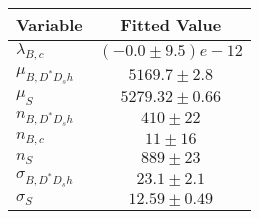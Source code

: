 \begin{tabular}[t]{lc}
\hline
Variable &Fitted Value\\
\hline\hline
$\lambda_{B,c}$&$(-0.0\pm9.5)e-12$\\
\hline
$\mu_{B, D^* D_s h}$&$5169.7\pm2.8$\\
\hline
$\mu_S$&$5279.32\pm0.66$\\
\hline
$n_{B, D^* D_s h}$&$410\pm22$\\
\hline
$n_{B,c}$&$11\pm16$\\
\hline
$n_S$&$889\pm23$\\
\hline
$\sigma_{B, D^* D_s h}$&$23.1\pm2.1$\\
\hline
$\sigma_S$&$12.59\pm0.49$\\
\hline
\end{tabular}